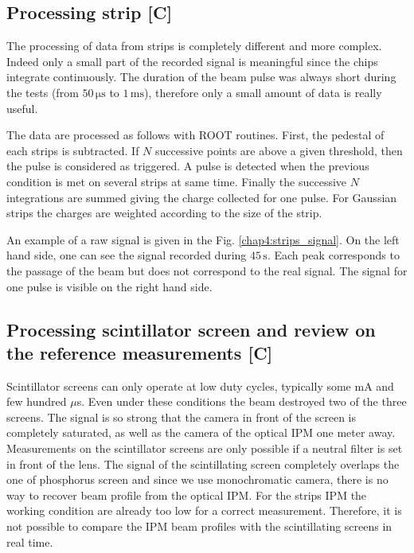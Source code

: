 \begin{refsection}
  

  \subsection{Processing strip [C]}
  The processing of data from strips is completely different and more complex. Indeed only a small part of the recorded signal is meaningful since the chips integrate continuously. The duration of the beam pulse was always short during the tests (from $50\,\mathrm{\mu s}$ to $1\,\mathrm{ms}$), therefore only a small amount of data is really useful.

  The data are processed as follows with ROOT\cite{Brun1997,Antcheva2009} routines. First, the pedestal of each strips is subtracted. If $N$ successive points are above a given threshold, then the pulse is considered as triggered. A pulse is detected when the previous condition is met on several strips at same time. Finally the successive $N$ integrations are summed giving the charge collected for one pulse. For Gaussian strips the charges are weighted according to the size of the strip.

  An example of a raw signal is given in the Fig. \ref{chap4:strips_signal}. On the left hand side, one can see the signal recorded during $45\,\mathrm{s}$. Each peak corresponds to the passage of the beam but does not correspond to the real signal. The signal for one pulse is visible on the right hand side.

  


  \subsection{Processing scintillator screen and review on the reference measurements [C]}
  Scintillator screens can only operate at low duty cycles, typically some mA and few hundred $\mu$s. Even under these conditions the beam destroyed two of the three screens. The signal is so strong that the camera in front of the screen is completely saturated, as well as the camera of the optical IPM one meter away. Measurements on the scintillator screens are only possible if a neutral filter is set in front of the lens. The signal of the scintillating screen completely overlaps the one of phosphorus screen and since we use monochromatic camera, there is no way to recover beam profile from the optical IPM. For the strips IPM the working condition are already too low for a correct measurement. Therefore, it is  not possible to compare the IPM beam profiles with the scintillating screens in real time.
  


\end{refsection}
